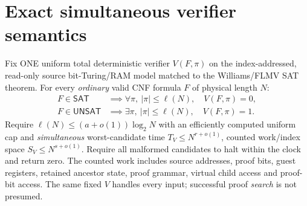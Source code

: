 \documentclass[11pt]{article}
\begin{document}
\section{Exact simultaneous verifier semantics}
Fix ONE uniform total deterministic verifier $V(F,\pi)$ on the
index-addressed, read-only source bit-Turing/RAM model matched to the
Williams/FLMV SAT theorem. For every \emph{ordinary} valid CNF formula
$F$ of physical length $N$:
\[
\begin{split}
F\in\mathsf{SAT}&\implies\forall\pi,\ |\pi|\le\ell(N),\quad V(F,\pi)=0,\\
F\in\mathsf{UNSAT}&\implies\exists\pi,\ |\pi|\le\ell(N),\quad V(F,\pi)=1.
\end{split}\tag{1}
\]
Require $\ell(N)\le(a+o(1))\log_2N$ with an efficiently computed
uniform cap and \emph{simultaneous} worst-candidate time
$T_V\le N^{r+o(1)}$, counted work/index space
$S_V\le N^{s+o(1)}$. Require all malformed candidates to halt
within the clock and return zero. The counted work includes source
addresses, proof bits, guest registers, retained ancestor state,
proof grammar, virtual child access and proof-bit access. The
same fixed $V$ handles every input; successful proof \emph{search}
is not presumed.
\end{document}
